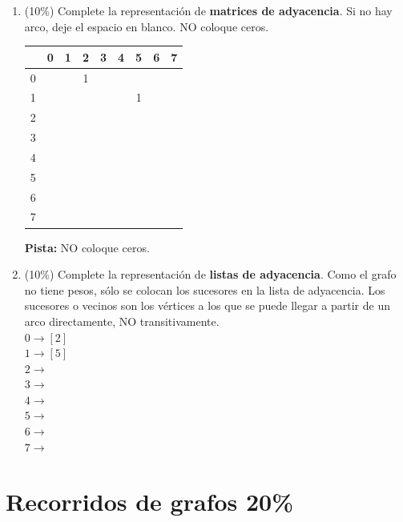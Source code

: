 \documentclass[twocolumn]{article}
\begin{document}
\begin{enumerate}[label=\Alph*]
\item (10\%) Complete la representación de \textbf{matrices de adyacencia}. Si no hay arco,
  deje el espacio en blanco. NO coloque ceros.

\begin{center}
\begin{tabular}{| c | c | c | c | c | c | c | c | c |}
\hline
  & 0 & 1 & 2 & 3 & 4 & 5 & 6 & 7 \\
\hline
0 &   &   & 1  &  &   &   &   &   \\
\hline
1 &   &   &   &   &   & 1  &   &   \\
\hline
2 &   &   &   &   &   &   &   &   \\
\hline
3 &   &   &   &   &   &   &   &   \\
\hline
4 &   &   &   &   &   &   &   &   \\
\hline
5 &   &   &   &   &   &   &   &   \\
\hline
6 &   &   &   &   &   &   &   &   \\
\hline
7 &   &   &   &   &   &   &   &   \\ 
\hline
\end{tabular}
\end{center}

\textbf{Pista:} NO coloque ceros.

	\item (10\%) Complete la representación de \textbf{listas de adyacencia}. Como
  el grafo no tiene pesos, sólo se colocan los sucesores en la lista de adyacencia.
  Los sucesores o vecinos son los vértices a los que se puede llegar a partir de
  un arco directamente, NO transitivamente. \\


$0 \rightarrow [2]$\\
$1 \rightarrow [5]$ \\
$2 \rightarrow$\\
$3 \rightarrow$\\
$4 \rightarrow$\\
$5 \rightarrow$\\
$6 \rightarrow$\\
$7 \rightarrow$\\


\end{enumerate}



\section{Recorridos de grafos 20\%}
\end{document}
